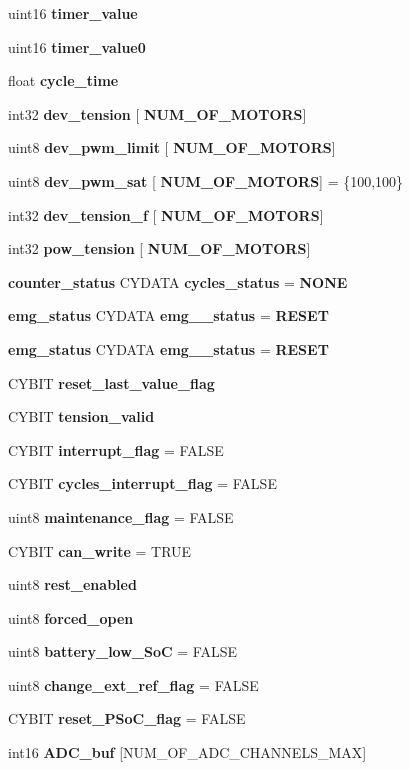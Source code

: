\begin{DoxyCompactItemize}
\item 
uint16 \textbf{ timer\+\_\+value}
\item 
uint16 \textbf{ timer\+\_\+value0}
\item 
float \textbf{ cycle\+\_\+time}
\item 
int32 \textbf{ dev\+\_\+tension} [\textbf{ N\+U\+M\+\_\+\+O\+F\+\_\+\+M\+O\+T\+O\+RS}]
\item 
uint8 \textbf{ dev\+\_\+pwm\+\_\+limit} [\textbf{ N\+U\+M\+\_\+\+O\+F\+\_\+\+M\+O\+T\+O\+RS}]
\item 
uint8 \textbf{ dev\+\_\+pwm\+\_\+sat} [\textbf{ N\+U\+M\+\_\+\+O\+F\+\_\+\+M\+O\+T\+O\+RS}] = \{100,100\}
\item 
int32 \textbf{ dev\+\_\+tension\+\_\+f} [\textbf{ N\+U\+M\+\_\+\+O\+F\+\_\+\+M\+O\+T\+O\+RS}]
\item 
int32 \textbf{ pow\+\_\+tension} [\textbf{ N\+U\+M\+\_\+\+O\+F\+\_\+\+M\+O\+T\+O\+RS}]
\item 
\textbf{ counter\+\_\+status} C\+Y\+D\+A\+TA \textbf{ cycles\+\_\+status} = \textbf{ N\+O\+NE}
\item 
\textbf{ emg\+\_\+status} C\+Y\+D\+A\+TA \textbf{ emg\+\_\+\_\+status} = \textbf{ R\+E\+S\+ET}
\item 
\textbf{ emg\+\_\+status} C\+Y\+D\+A\+TA \textbf{ emg\+\_\+\_\+status} = \textbf{ R\+E\+S\+ET}
\item 
C\+Y\+B\+IT \textbf{ reset\+\_\+last\+\_\+value\+\_\+flag}
\item 
C\+Y\+B\+IT \textbf{ tension\+\_\+valid}
\item 
C\+Y\+B\+IT \textbf{ interrupt\+\_\+flag} = F\+A\+L\+SE
\item 
C\+Y\+B\+IT \textbf{ cycles\+\_\+interrupt\+\_\+flag} = F\+A\+L\+SE
\item 
uint8 \textbf{ maintenance\+\_\+flag} = F\+A\+L\+SE
\item 
C\+Y\+B\+IT \textbf{ can\+\_\+write} = T\+R\+UE
\item 
uint8 \textbf{ rest\+\_\+enabled}
\item 
uint8 \textbf{ forced\+\_\+open}
\item 
uint8 \textbf{ battery\+\_\+low\+\_\+\+SoC} = F\+A\+L\+SE
\item 
uint8 \textbf{ change\+\_\+ext\+\_\+ref\+\_\+flag} = F\+A\+L\+SE
\item 
C\+Y\+B\+IT \textbf{ reset\+\_\+\+P\+So\+C\+\_\+flag} = F\+A\+L\+SE
\item 
\mbox{\label{globals_8c_a2fbad668712e226379890e1debdc9ff2}} 
int16 {\bfseries A\+D\+C\+\_\+buf} [N\+U\+M\+\_\+\+O\+F\+\_\+\+A\+D\+C\+\_\+\+C\+H\+A\+N\+N\+E\+L\+S\+\_\+\+M\+AX]

\end{DoxyCompactItemize}

